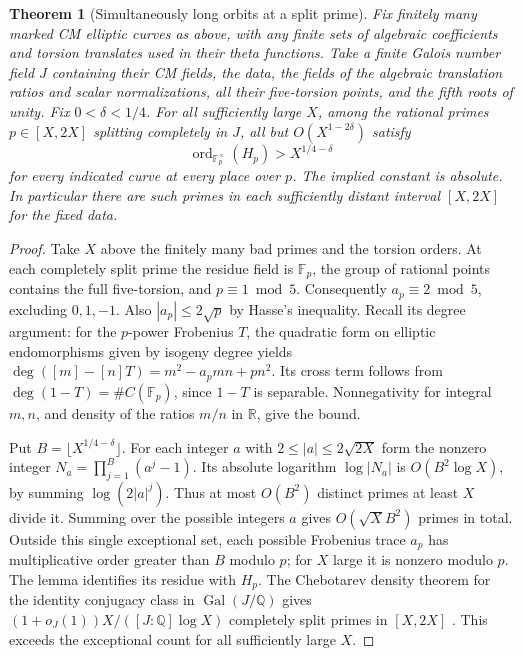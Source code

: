 \documentclass[a4paper,11pt]{article}
\newtheorem{theorem}[proposition]{Theorem}
\theoremstyle{definition}
\theoremstyle{remark}
\numberwithin{equation}{section}
\begin{document}
\begin{theorem}[Simultaneously long orbits at a split prime]\leavevmode
\label{thm:commonsplit483}
Fix finitely many marked CM elliptic curves as above, with
any finite sets of algebraic coefficients and torsion translates
used in their theta functions. Take a finite Galois number field
\(J\) containing their CM fields, the data, the fields of the
algebraic translation ratios and scalar normalizations, all their
five-torsion points, and the fifth roots of unity. Fix
\(0<\delta<1/4\). For all sufficiently large \(X\), among the
rational primes \(p\in[X,2X]\) splitting completely in \(J\),
all but \(O(X^{1-2\delta})\) satisfy
\[
          \operatorname{ord}_{\mathbb F_p^\times}(H_p)
                     >X^{1/4-\delta}
\]
for every indicated curve at every place over \(p\).
The implied constant is absolute. In particular there are such
primes in each sufficiently distant interval \([X,2X]\) for the
fixed data.
\end{theorem}
\begin{proof}
Take \(X\) above the finitely many bad primes and the torsion
orders. At each completely split prime the residue field is
\(\mathbb F_p\), the group of rational points contains the full
five-torsion, and \(p\equiv1\bmod 5\). Consequently
\(a_p\equiv2\bmod 5\), excluding \(0,1,-1\).
Also \(|a_p|\le2\sqrt p\) by Hasse's inequality. Recall its
degree argument: for the \(p\)-power Frobenius \(T\), the quadratic
form on elliptic endomorphisms given by isogeny degree yields
\(\deg([m]-[n]T)=m^2-a_pmn+pn^2\). Its cross term follows from
\(\deg(1-T)=\#C(\mathbb F_p)\), since \(1-T\) is separable.
Nonnegativity for integral \(m,n\), and density of the ratios
\(m/n\) in \(\mathbb R\), give the bound.

Put \(B=\lfloor X^{1/4-\delta}\rfloor\). For each integer
\(a\) with \(2\le |a|\le2\sqrt{2X}\) form the nonzero integer
\(N_a=\prod_{j=1}^B(a^j-1)\).
Its absolute logarithm \(\log |N_a|\) is \(O(B^2\log X)\),
by summing \(\log(2|a|^j)\). Thus at most \(O(B^2)\) distinct
primes at least \(X\) divide it. Summing over the possible
integers \(a\) gives \(O(\sqrt X B^2)\) primes in total.
Outside this single exceptional set, each possible Frobenius
trace \(a_p\) has multiplicative order greater than \(B\)
modulo \(p\); for \(X\) large it is nonzero modulo \(p\).
The lemma identifies its residue with \(H_p\).
The Chebotarev density theorem for the identity conjugacy class
in \(\operatorname{Gal}(J/\mathbb Q)\) gives
\((1+o_J(1))X/([J:\mathbb Q]\log X)\) completely split primes
in \([X,2X]\) \cite[\S1A]{XIII-X-I-tz50}. This exceeds the exceptional
count for all sufficiently large \(X\).
\end{proof}
\end{document}
